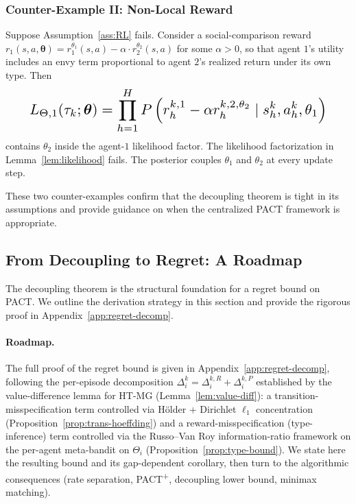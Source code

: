 \subsubsection{Counter-Example II: Non-Local Reward}

Suppose Assumption~\ref{ass:RL} fails. Consider a social-comparison reward $r_1(s, a, \boldsymbol{\theta}) = r_1^{\theta_1}(s, a) - \alpha \cdot r_2^{\theta_2}(s, a)$ for some $\alpha > 0$, so that agent $1$'s utility includes an envy term proportional to agent $2$'s realized return under its own type. Then
\begin{equation}\resizebox{0.9\linewidth}{!}{$\displaystyle L_{\Theta,1}(\tau_k; \boldsymbol{\theta}) = \prod_{h=1}^H P\left(r_h^{k,1} - \alpha r_h^{k,2,\theta_2} \mid s_h^k, a_h^k, \theta_1\right) $}\end{equation}
contains $\theta_2$ inside the agent-$1$ likelihood factor. The likelihood factorization in Lemma~\ref{lem:likelihood} fails. The posterior couples $\theta_1$ and $\theta_2$ at every update step.

These two counter-examples confirm that the decoupling theorem is tight in its assumptions and provide guidance on when the centralized PACT framework is appropriate.

\subsection{From Decoupling to Regret: A Roadmap}
\label{sec:regret-roadmap}

The decoupling theorem is the structural foundation for a regret bound on PACT. We outline the derivation strategy in this section and provide the rigorous proof in Appendix~\ref{app:regret-decomp}.

\paragraph{Roadmap.} The full proof of the regret bound is given in Appendix~\ref{app:regret-decomp}, following the per-episode decomposition $\Delta_i^k = \Delta_i^{k,R} + \Delta_i^{k,P}$ established by the value-difference lemma for HT-MG (Lemma~\ref{lem:value-diff}): a transition-misspecification term controlled via H\"older + Dirichlet $\ell_1$ concentration (Proposition~\ref{prop:trans-hoeffding}) and a reward-misspecification (type-inference) term controlled via the Russo--Van Roy information-ratio framework on the per-agent meta-bandit on $\Theta_i$ (Proposition~\ref{prop:type-bound}). We state here the resulting bound and its gap-dependent corollary, then turn to the algorithmic consequences (rate separation, PACT\textsuperscript{+}, decoupling lower bound, minimax matching).

